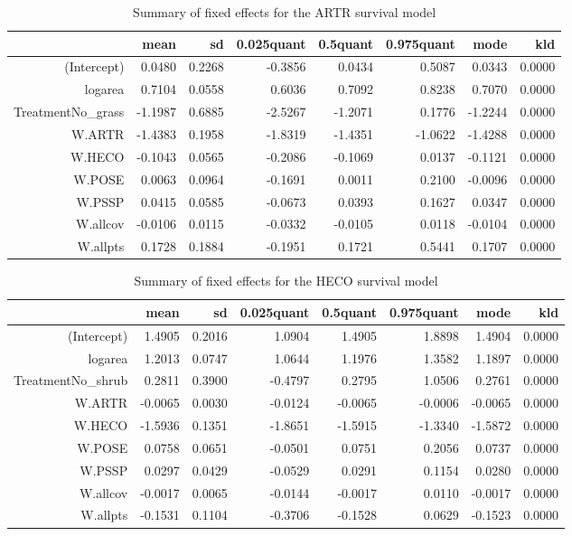 \begin{table}[ht]
\centering
\caption{Summary of fixed effects for the ARTR survival model} 
\label{ARTRsurvival}
\begin{tabular}{rrrrrrrr}
  \hline
 & mean & sd & 0.025quant & 0.5quant & 0.975quant & mode & kld \\ 
  \hline
(Intercept) & 0.0480 & 0.2268 & -0.3856 & 0.0434 & 0.5087 & 0.0343 & 0.0000 \\ 
  logarea & 0.7104 & 0.0558 & 0.6036 & 0.7092 & 0.8238 & 0.7070 & 0.0000 \\ 
  TreatmentNo\_grass & -1.1987 & 0.6885 & -2.5267 & -1.2071 & 0.1776 & -1.2244 & 0.0000 \\ 
  W.ARTR & -1.4383 & 0.1958 & -1.8319 & -1.4351 & -1.0622 & -1.4288 & 0.0000 \\ 
  W.HECO & -0.1043 & 0.0565 & -0.2086 & -0.1069 & 0.0137 & -0.1121 & 0.0000 \\ 
  W.POSE & 0.0063 & 0.0964 & -0.1691 & 0.0011 & 0.2100 & -0.0096 & 0.0000 \\ 
  W.PSSP & 0.0415 & 0.0585 & -0.0673 & 0.0393 & 0.1627 & 0.0347 & 0.0000 \\ 
  W.allcov & -0.0106 & 0.0115 & -0.0332 & -0.0105 & 0.0118 & -0.0104 & 0.0000 \\ 
  W.allpts & 0.1728 & 0.1884 & -0.1951 & 0.1721 & 0.5441 & 0.1707 & 0.0000 \\ 
   \hline
\end{tabular}
\end{table}

\begin{table}[ht]
\centering
\caption{Summary of fixed effects for the HECO survival model} 
\label{HECOsurvival}
\begin{tabular}{rrrrrrrr}
  \hline
 & mean & sd & 0.025quant & 0.5quant & 0.975quant & mode & kld \\ 
  \hline
(Intercept) & 1.4905 & 0.2016 & 1.0904 & 1.4905 & 1.8898 & 1.4904 & 0.0000 \\ 
  logarea & 1.2013 & 0.0747 & 1.0644 & 1.1976 & 1.3582 & 1.1897 & 0.0000 \\ 
  TreatmentNo\_shrub & 0.2811 & 0.3900 & -0.4797 & 0.2795 & 1.0506 & 0.2761 & 0.0000 \\ 
  W.ARTR & -0.0065 & 0.0030 & -0.0124 & -0.0065 & -0.0006 & -0.0065 & 0.0000 \\ 
  W.HECO & -1.5936 & 0.1351 & -1.8651 & -1.5915 & -1.3340 & -1.5872 & 0.0000 \\ 
  W.POSE & 0.0758 & 0.0651 & -0.0501 & 0.0751 & 0.2056 & 0.0737 & 0.0000 \\ 
  W.PSSP & 0.0297 & 0.0429 & -0.0529 & 0.0291 & 0.1154 & 0.0280 & 0.0000 \\ 
  W.allcov & -0.0017 & 0.0065 & -0.0144 & -0.0017 & 0.0110 & -0.0017 & 0.0000 \\ 
  W.allpts & -0.1531 & 0.1104 & -0.3706 & -0.1528 & 0.0629 & -0.1523 & 0.0000 \\ 
   \hline
\end{tabular}
\end{table}

